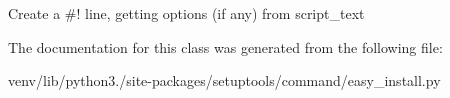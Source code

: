 \begin{DoxyVerb}Create a #! line, getting options (if any) from script_text\end{DoxyVerb}
 

The documentation for this class was generated from the following file\+:\begin{DoxyCompactItemize}
\item 
venv/lib/python3./site-\/packages/setuptools/command/easy\+\_\+install.\+py\end{DoxyCompactItemize}
